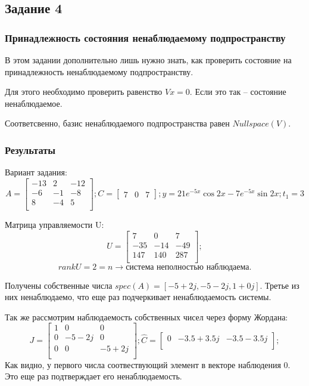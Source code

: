 \subsection{Задание 4}
\subsubsection{Принадлежность состояния ненаблюдаемому подпространству}
В этом задании дополнительно лишь нужно знать, как проверить состояние на принадлежность ненаблюдаемому подпространству.

Для этого необходимо проверить равенство \(Vx = 0\). Если это так -- состояние ненаблюдаемое.

Соответсвенно, базис ненаблюдаемого подпространства равен \(Nullspace(V)\).


\subsubsection{Результаты}
Вариант задания:
\[ A = \begin{bmatrix}
        -13 & 2 & -12 \\
        -6 & -1 & -8 \\
        8 & -4 & 5 \\
        \end{bmatrix}; 
        C = \begin{bmatrix}
                7 & 0 & 7
                \end{bmatrix}; 
        y = 21 e^{-5x}\cos{2x} - 7 e^{-5x}\sin{2x}; 
        t_1 = 3
\]

Матрица управляемости U:
\[ U = \begin{bmatrix}
        7 & 0 & 7 \\
        -35 & -14 & -49 \\
        147 & 140 & 287 \\
        \end{bmatrix};
\]
\[rankU = 2 = n \rightarrow \text{система  неполностью наблюдаема.}\]

Получены собственные числа \(spec(A) = [-5+2j, -5 -2j, 1+0j]\). Третье из них ненаблюдаемо, что еще раз подчеркивает ненаблюдаемость системы.

Так же рассмотрим наблюдаемость собственных чисел через форму Жордана:
\[
        J = \begin{bmatrix}
                1 & 0 & 0 \\
                0 & -5 - 2j & 0 \\
                0 & 0 & -5 + 2j \\
                \end{bmatrix};
        \hat{C} = \begin{bmatrix}
                0 &
                -3.5 + 3.5j &
                -3.5 - 3.5j \\
                \end{bmatrix};
\]
Как видно, у первого числа соотвествующий элемент в векторе наблюдения 0. Это еще раз подтверждает его ненаблюдаемость.

